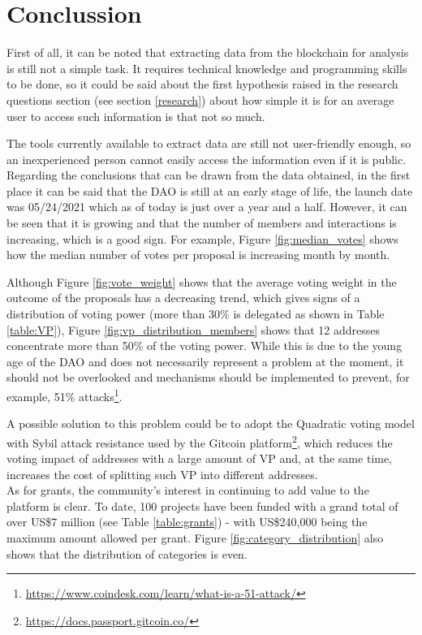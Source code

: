 \documentclass[MSE,Master,english]{twbook}%
\begin{document}
\chapter{Conclussion\label{conclussion}}
First of all, it can be noted that extracting data from the blockchain for analysis is still not a simple task. It requires technical knowledge and programming skills to be done, so it could be said about the first hypothesis raised in the research questions section (see section \ref{research}) about how simple it is for an average user to access such information is that not so much.

The tools currently available to extract data are still not user-friendly enough, so an inexperienced person cannot easily access the information even if it is public. \\

Regarding the conclusions that can be drawn from the data obtained, in the first place it can be said that the DAO is still at an early stage of life, the launch date was 05/24/2021 which as of today is just over a year and a half. However, it can be seen that it is growing and that the number of members and interactions is increasing, which is a good sign. For example, Figure \ref{fig:median_votes} shows how the median number of votes per proposal is increasing month by month.

Although Figure \ref{fig:vote_weight} shows that the average voting weight in the outcome of the proposals has a decreasing trend, which gives signs of a distribution of voting power (more than 30\% is delegated as shown in Table \ref{table:VP}), Figure \ref{fig:vp_distribution_members} shows that 12 addresses concentrate more than 50\% of the voting power. While this is due to the young age of the DAO and does not necessarily represent a problem at the moment, it should not be overlooked and mechanisms should be implemented to prevent, for example, 51\% attacks\footnote{\url{https://www.coindesk.com/learn/what-is-a-51-attack/}}. 

A possible solution to this problem could be to adopt the Quadratic voting model with Sybil attack resistance used by the Gitcoin platform\footnote{\url{https://docs.passport.gitcoin.co/}}, which reduces the voting impact of addresses with a large amount of VP and, at the same time, increases the cost of splitting such VP into different addresses. \\

As for grants, the community's interest in continuing to add value to the platform is clear.  To date, 100 projects have been funded with a grand total of over US\$7 million (see Table \ref{table:grants}) - with US\$240,000 being the maximum amount allowed per grant. Figure \ref{fig:category_distribution} also shows that the distribution of categories is even.
\end{document}

